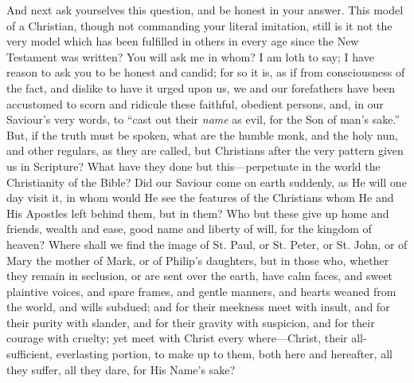 And next ask yourselves this question, and be honest in your
answer. This model of a Christian, though not commanding your literal
imitation, still is it not the very model which has been fulfilled in
others in every age since the New Testament was written? You will ask
me in whom? I am loth to say; I have reason to ask you to be honest
and candid; for so it is, as if from consciousness of the fact, and
dislike to have it urged upon us, we and our forefathers have been
accustomed to scorn and ridicule these faithful, obedient persons,
and, in our Saviour's very words, to ``cast out their \emph{name}
as evil, for the Son of man's sake.'' But, if the truth must be
spoken, what are the humble monk, and the holy nun, and other
regulars, as they are called, but Christians after the very pattern
given us in Scripture? What have they done but this—perpetuate in
the world the Christianity of the Bible? Did our Saviour come on earth
suddenly, as He will one day visit it, in whom would He see the
features of the Christians whom He and His Apostles left behind them,
but in them? Who but these give up home and friends, wealth and ease,
good name and liberty of will, for the kingdom of heaven? Where shall
we find the image of St. Paul, or St. Peter, or St. John, or of Mary
the mother of Mark, or of Philip's daughters, but in those who,
whether they remain in seclusion, or are sent over the earth, have
calm faces, and sweet plaintive voices, and spare frames, and gentle
manners, and hearts weaned from the world, and wills subdued; and for
their meekness meet with insult, and for their purity with slander,
and for their gravity with suspicion, and for their courage with
cruelty; yet meet with Christ every where—Christ, their
all-sufficient, everlasting portion, to make up to them, both here and
hereafter, all they suffer, all they dare, for His Name's sake?

